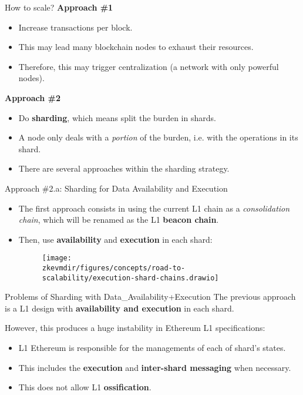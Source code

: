 \begin{frame} {How to scale?}
  \textbf{Approach \#1}
  \begin{itemize}
    \item Increase transactions per block.
    \item This may lead many blockchain nodes to exhaust their resources.
    \item Therefore, this may trigger centralization (a network with only powerful nodes).
  \end{itemize}
  \textbf{Approach \#2}
  \begin{itemize}
    \item Do \textbf{sharding}, which means split the burden in shards.

    \item A node only deals with a \textit{portion} of the burden, i.e. with the operations
    in its shard.

    \item There are several approaches within the sharding strategy.
  \end{itemize}
\end{frame}






\begin{frame} {Approach \#2.a: Sharding for Data Availability and Execution}
  \begin{itemize}
    \item The first approach consists in using the current L1 chain as a \textit{consolidation chain}, 
    which will be renamed as the L1 \textbf{beacon chain}.
    \item Then, use \textbf{availability} and \textbf{execution} in each shard:

    \begin{figure}
      \centering
      \texttt{[image: \\zkevmdir/figures/concepts/road-to-scalability/execution-shard-chains.drawio]}
    \end{figure}
  \end{itemize}
\end{frame}





\begin{frame} {Problems of Sharding with Data\_Availability+Execution}
The previous approach is a L1 design with \textbf{availability and execution} in each shard.

\vspace{0.15cm}
However, this produces a huge instability in Ethereum L1 specifications:
\begin{itemize}
\item L1 Ethereum is responsible for the managements of each of shard's states.
\item This includes the \textbf{execution} and \textbf{inter-shard messaging} when necessary.
\item This does not allow L1 \textbf{ossification}.
\end{itemize}
\end{frame}





